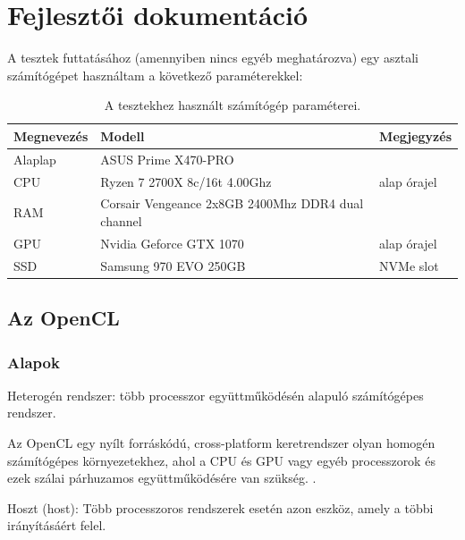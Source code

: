 \chapter{Fejlesztői dokumentáció} %
\label{ch:impl}

A tesztek futtatásához (amennyiben nincs egyéb meghatározva) egy asztali számítógépet használtam a következő paraméterekkel:

\begin{table}[h]
\centering
    \begin{tabular}{|l|l|l|}
        \hline
        \textbf{Megnevezés} & \textbf{Modell} & \textbf{Megjegyzés} \\
        \hline
        Alaplap & ASUS Prime X470-PRO & \\
        \hline
        CPU & Ryzen 7 2700X 8c/16t 4.00Ghz & alap órajel \\
        \hline
        RAM & Corsair Vengeance 2x8GB 2400Mhz DDR4 dual channel & \\
        \hline
        GPU & Nvidia Geforce GTX 1070 & alap órajel \\
        \hline
        SSD & Samsung 970 EVO 250GB & NVMe slot \\
        \hline
    \end{tabular}
    \caption{A tesztekhez használt számítógép paraméterei.}
\end{table}


\section{Az OpenCL}



\subsection{Alapok}


\begin{definition}
Heterogén rendszer: több processzor együttműködésén alapuló számítógépes rendszer.
\end{definition}


Az OpenCL egy nyílt forráskódú, cross-platform keretrendszer olyan homogén számítógépes környezetekhez, ahol a CPU és GPU vagy egyéb processzorok és ezek szálai párhuzamos együttműködésére van szükség. \cite{munshi2011opencl}.


\begin{definition}
Hoszt (host): Több processzoros rendszerek esetén azon eszköz, amely a többi irányításáért felel.
\end{definition}

